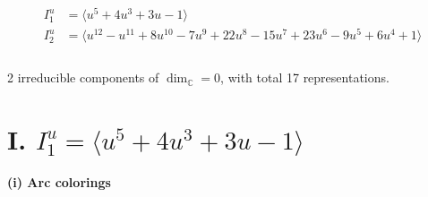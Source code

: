 \documentclass[1p]{elsarticle_modified}
\theoremstyle{definition}
\begin{document}
\begin{align*}
I^u_{1}&=\langle 
u^5+4 u^3+3 u-1\rangle \\
I^u_{2}&=\langle 
u^{12}- u^{11}+8 u^{10}-7 u^9+22 u^8-15 u^7+23 u^6-9 u^5+6 u^4+1\rangle \\
\\
\end{align*}
\raggedright * 2 irreducible components of $\dim_{\mathbb{C}}=0$, with total 17 representations.\\
\newpage
\renewcommand{\arraystretch}{1}
\centering \section*{I. $I^u_{1}= \langle u^5+4 u^3+3 u-1 \rangle$}
\flushleft \textbf{(i) Arc colorings}\\
\end{document}

